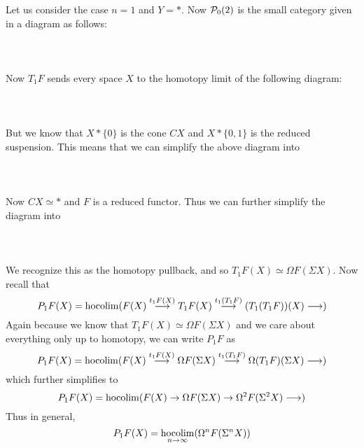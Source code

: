 \documentclass[a4paper]{article}
\begin{document}
Let us consider the case $n=1$ and $Y=\ast$. Now $\mathcal{P}_0(2)$ is the small category given in a diagram as follows: \\~\\
\\~\\
Now $T_1F$ sends every space $X$ to the homotopy limit of the following diagram: \\~\\
\\~\\
But we know that $X\ast\{0\}$ is the cone $CX$ and $X\ast\{0,1\}$ is the reduced suspension. This means that we can simplify the above diagram into \\~\\
\\~\\
Now $CX\simeq\ast$ and $F$ is a reduced functor. Thus we can further simplify the diagram into \\~\\
\\~\\
We recognize this as the homotopy pullback, and so $T_1F(X)\simeq\Omega F(\Sigma X)$. Now recall that $$P_1F(X)=\operatorname*{hocolim}(F(X)\overset{t_1F(X)}{\longrightarrow} T_1F(X)\overset{t_1(T_1F)}{\longrightarrow}(T_1(T_1F))(X)\longrightarrow)$$ Again because we know that $T_1F(X)\simeq\Omega F(\Sigma X)$ and we care about everything only up to homotopy, we can write $P_1F$ as $$P_1F(X)=\operatorname*{hocolim}(F(X)\overset{t_1F(X)}{\longrightarrow} \Omega F(\Sigma X)\overset{t_1(T_1F)}{\longrightarrow}\Omega(T_1F)(\Sigma X)\longrightarrow)$$ which further simplifies to $$P_1F(X)=\operatorname*{hocolim}(F(X)\to\Omega F(\Sigma X)\to\Omega^2 F(\Sigma^2 X)\longrightarrow)$$ Thus in general, $$P_1F(X)=\operatorname*{hocolim}_{n\to\infty}(\Omega^n F(\Sigma^n X))$$
\end{document}

